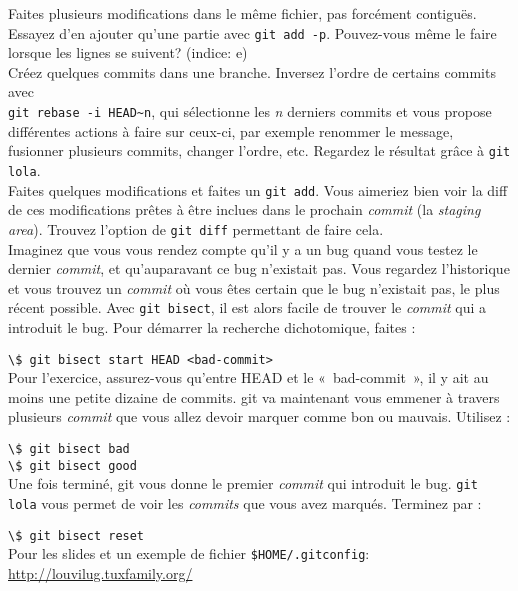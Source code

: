 \documentclass[a4paper,11pt]{article}
\newcommand{\code}[1]{\lstinline{#1}}
\newcommand{\shell}[1]{\hspace*{1cm}\lstinline{\$ #1}\\}
\begin{document}
Faites plusieurs modifications dans le même fichier, pas forcément contiguës. Essayez d'en ajouter qu'une partie avec \code{git add -p}. Pouvez-vous même le faire lorsque les lignes se suivent? (indice: e) \\

Créez quelques commits dans une branche. Inversez l'ordre de certains commits avec\\
\code{git rebase -i HEAD~n}, qui sélectionne les \textit{n} derniers commits et vous propose différentes actions à faire sur ceux-ci, par exemple renommer le message, fusionner plusieurs commits, changer l'ordre, etc. Regardez le résultat grâce à \code{git lola}. \\

Faites quelques modifications et faites un \code{git add}. Vous aimeriez bien voir la diff de ces modifications prêtes à être inclues dans le prochain \emph{commit} (la \textit{staging area}). Trouvez l'option de \code{git diff} permettant de faire cela. \\

Imaginez que vous vous rendez compte qu'il y a un bug quand vous testez le dernier \emph{commit}, et qu'auparavant ce bug n'existait pas. Vous regardez l'historique et vous trouvez un \emph{commit} où vous êtes certain que le bug n'existait pas, le plus récent possible. Avec \code{git bisect}, il est alors facile de trouver le \emph{commit} qui a introduit le bug. Pour démarrer la recherche dichotomique, faites :

\shell{git bisect start HEAD <bad-commit>}

Pour l'exercice, assurez-vous qu'entre HEAD et le «~bad-commit~», il y ait au moins une petite dizaine de commits. git va maintenant vous emmener à travers plusieurs \emph{commit} que vous allez devoir marquer comme bon ou mauvais. Utilisez :

\shell{git bisect bad}
\shell{git bisect good}

Une fois terminé, git vous donne le premier \emph{commit} qui introduit le bug. \code{git lola} vous permet de voir les \emph{commits} que vous avez marqués. Terminez par :

\shell{git bisect reset}

Pour les slides et un exemple de fichier \code{$HOME/.gitconfig}: \url{http://louvilug.tuxfamily.org/}
\end{document}
